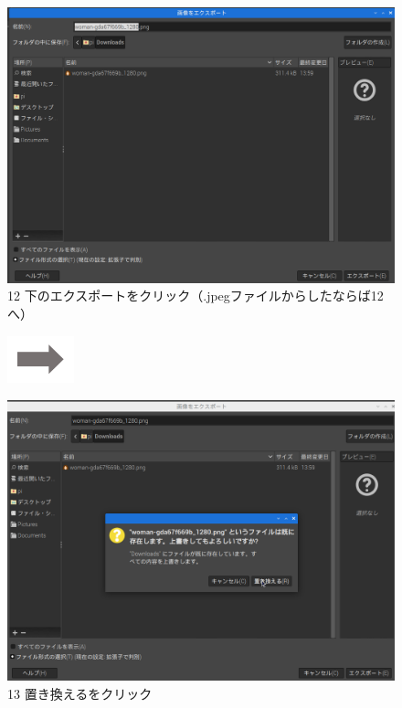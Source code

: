 \begin{figure}
  \begin{minipage}{\textwidth}
    \begin{minipage}{0.45\textwidth}
      \includegraphics[width=\linewidth]{text01-img/textbook-img137.png}\\
      12 下のエクスポートをクリック（.jpegファイルからしたならば12へ）
    \end{minipage}
    \includegraphics[width=1.919cm]{text01-img/textbook-img135.png}
    \begin{minipage}{0.45\textwidth}
      \includegraphics[width=\linewidth]{text01-img/textbook-img136.png}\\
      13 置き換えるをクリック
    \end{minipage}
  \end{minipage}


\end{figure}
